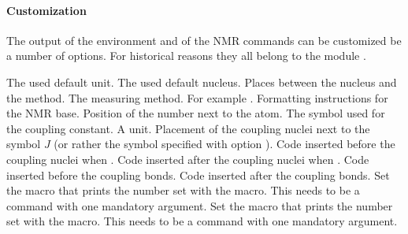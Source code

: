 \documentclass{chemmacros-manual}
\begin{document}
\paragraph{Customization}\label{sec:experimental-customization}

The output of the environment and of the NMR commands can be customized be a
number of options.  For historical reasons they all belong to the module
.
\begin{options}
    The used default unit.
    The used default nucleus.
  \Default{-}
    Places  between the nucleus and the method.
    The measuring method.
  \Default
    For example .
  \Default
    Formatting instructions for the NMR base.
    Position of the number next to the atom.
    The symbol used for the coupling constant.
    A  unit.
    Placement of the coupling nuclei next to the symbol $J$ (or rather the
    symbol specified with option ).
  \Default{(}
    Code inserted before the coupling nuclei when .
  \Default{)}
    Code inserted after the coupling nuclei when .
  \Default
    Code inserted before the coupling bonds.
  \Default{\cs*{!}}
    Code inserted after the coupling bonds.
    Set the macro that prints the number set with the  macro.  This
    needs to be a command with one mandatory argument.
    Set the macro that prints the number set with the \cs{\#} macro.  This
    needs to be a command with one mandatory argument.

\end{options}
\end{document}
